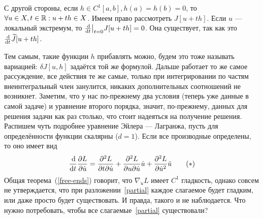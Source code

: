 \documentclass[a4paper]{article}
\begin{document}
    С другой стороны, если $h \in C^1[a, b], h(a) = h(b) = 0$, то $\forall u \in X, t \in \mathbb{R}: u + th \in X$.
    Имеем право рассмотреть $J[u + th]$. Если $u$ --- локальный экстремум, то $\frac{\operatorname{d}\! }{\operatorname{d}\! t}\big|_{t = 0}J[u + th] = 0$.
    Она существует, так как это $\frac{\operatorname{d}\!}{\operatorname{d}\! t}\widetilde{J}[u + th]$.

    Тем самым, такие функции $h$ прибавлять можно, будем это тоже называть вариацией: $\delta J[u, h]$ задаётся той же формулой.
    Дальше работает то же самое рассуждение, все действия те же самые, только при интегрировании по частям внеинтегральный член занулится, никаких дополнительных соотношений не возникнет.
    Заметим, что у нас по-прежнему два условия (теперь уже данные в самой задаче) и уравнение второго порядка, значит, по-прежнему, данных для решения задачи как раз столько, что стоит надеяться на получение решения.
    Распишем чуть подробнее уравнение Эйлера --- Лагранжа, пусть для определённости функции скалярны ($d = 1$).
    Если все производные определены, то оно имеет вид
    \[\frac{\operatorname{d}\!}{\operatorname{d}\! t}\frac{\partial L}{\partial \dot{u}} = \frac{\partial^2 L}{\partial t \partial \dot{u}} + \frac{\partial^2 L}{\partial u \partial \dot{u}}\dot{u} + \frac{\partial^2 L}{\partial \dot{u}^2}\ddot{u}\label{partial}\tag{$*$}\]
    Общая теорема~(\cref{free-ends}) говорит, что $\nabla_{\dot{u}}L$ имеет $C^1$ гладкость, однако совсем не утверждается, что при разложении~\eqref{partial} каждое слагаемое будет гладким, или даже просто будет существовать.
    И правда, такого и не наблюдается.
    Что нужно потребовать, чтобы все слагаемые~\eqref{partial} существовали?
\end{document}
